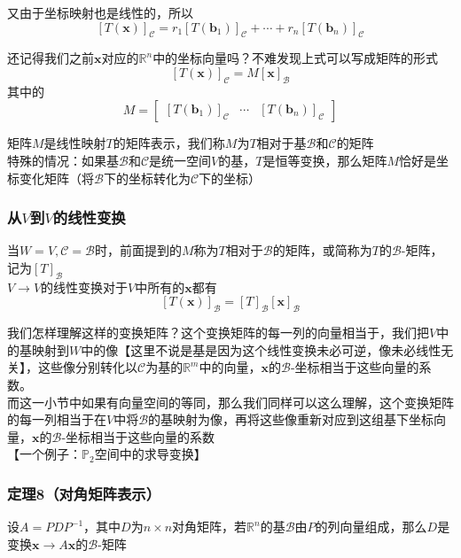 \documentclass{article}
\newcommand{\ve}{\boldsymbol}
\begin{document}
\begin{CJK}{UTF8}{gkai}
又由于坐标映射也是线性的，所以
\[[T(\ve{x})]_{\mathcal{C}}=r_1[T(\ve{b}_1)]_{\mathcal{C}}+\cdots+r_n[T(\ve{b}_n)]_{\mathcal{C}}\]

还记得我们之前$\ve{x}$对应的$\mathbb{R}^n$中的坐标向量吗？不难发现上式可以写成矩阵的形式
\[[T(\ve{x})]_{\mathcal{C}}=M[\ve{x}]_{\mathcal{B}}\]
其中的
\[M=
\begin{bmatrix}
    [T(\ve{b}_1)]_{\mathcal{C}}&\cdots&[T(\ve{b}_n)]_{\mathcal{C}} 
\end{bmatrix}\]

矩阵$M$是线性映射$T$的矩阵表示，我们称$M$为$T$相对于基$\mathcal{B}$和$\mathcal{C}$的矩阵\\

特殊的情况：如果基$\mathcal{B}$和$\mathcal{C}$是统一空间$V$的基，$T$是恒等变换，那么矩阵$M$恰好是坐标变化矩阵（将$\mathcal{B}$下的坐标转化为$\mathcal{C}$下的坐标）\\

\subsubsection{从$V$到$V$的线性变换}
当$W=V,\mathcal{C}=\mathcal{B}$时，前面提到的$M$称为$T$相对于$\mathcal{B}$的矩阵，或简称为$T$的$\mathcal{B}$-矩阵，记为$[T]_{\mathcal{B}}$\\

$V\to V$的线性变换对于$V$中所有的$\ve{x}$都有
\[[T(\ve{x})]_{\mathcal{B}}=[T]_{\mathcal{B}}[\ve{x}]_{\mathcal{B}}\]

我们怎样理解这样的变换矩阵？这个变换矩阵的每一列的向量相当于，我们把$V$中的基映射到$W$中的像【这里不说是基是因为这个线性变换未必可逆，像未必线性无关】，这些像分别转化以$\mathcal{C}$为基的$\mathbb{R}^m$中的向量，$\ve{x}$的$\mathcal{B}$-坐标相当于这些向量的系数。\\

而这一小节中如果有向量空间的等同，那么我们同样可以这么理解，这个变换矩阵的每一列相当于在$V$中将$\mathcal{B}$的基映射为像，再将这些像重新对应到这组基下坐标向量，$\ve{x}$的$\mathcal{B}$-坐标相当于这些向量的系数\\
【一个例子：$\mathbb{P}_2$空间中的求导变换】\\

\subsubsection{定理8（对角矩阵表示）}
设$A=PDP^{-1}$，其中$D$为$n\times n$对角矩阵，若$\mathbb{R}^n$的基$\mathcal{B}$由$P$的列向量组成，那么$D$是变换$\ve{x}\to A\ve{x}$的$\mathcal{B}$-矩阵\\


\end{CJK}
\end{document}
